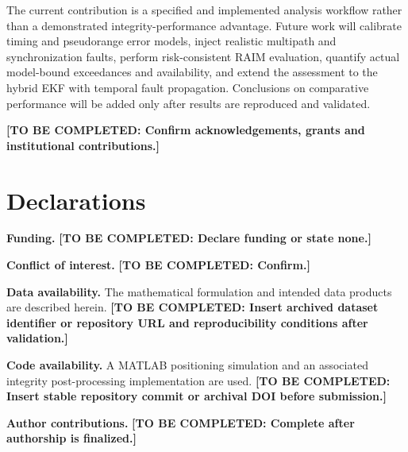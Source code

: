 \documentclass[pdflatex,sn-mathphys-num]{sn-jnl}
\newcommand{\todo}[1]{\textbf{[TO BE COMPLETED: #1]}}
\begin{document}
The current contribution is a specified and implemented analysis
workflow rather than a demonstrated integrity-performance advantage.
Future work will calibrate timing and pseudorange error models,
inject realistic multipath and synchronization faults, perform
risk-consistent RAIM evaluation, quantify actual model-bound
exceedances and availability, and extend the assessment to the
hybrid EKF with temporal fault propagation. Conclusions on
comparative performance will be added only after results are
reproduced and validated.

\backmatter

\todo{Confirm acknowledgements, grants and institutional contributions.}

\section*{Declarations}
\textbf{Funding.} \todo{Declare funding or state none.}

\textbf{Conflict of interest.} \todo{Confirm.}

\textbf{Data availability.} The mathematical formulation and intended data
products are described herein. \todo{Insert archived dataset identifier or repository
URL and reproducibility conditions after validation.}

\textbf{Code availability.} A MATLAB positioning simulation and an
associated integrity post-processing implementation are used.
\todo{Insert stable repository commit or archival DOI before submission.}

\textbf{Author contributions.} \todo{Complete after authorship is finalized.}
\end{document}

